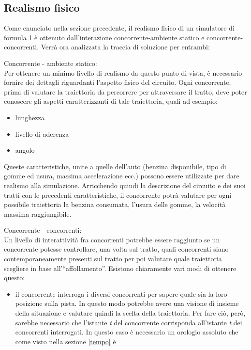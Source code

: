 \subsection{Realismo fisico}
\label{analisi_realismo_fisico}
Come enunciato nella sezione precedente, il realismo fisico di un simulatore di
formula 1 è ottenuto dall'interazione
concorrente-ambiente statico e concorrente-concorrenti. Verrà ora analizzata la
traccia di soluzione per entrambi:
\begin{description}
\item{Concorrente - ambiente statico:}\\
Per ottenere un minimo livello di realismo da questo punto di vista, è
necessario fornire dei dettagli riguardanti l'aspetto fisico
del circuito. Ogni concorrente, prima di valutare la traiettoria da percorrere
per attraversare il tratto, deve poter conoscere
gli aspetti caratterizzanti di tale traiettoria, quali ad esempio:
\begin{itemize}
\item lunghezza 
\item livello di aderenza
\item angolo
\end{itemize}
Queste caratteristiche, unite a quelle dell'auto (benzina disponibile, tipo di
gomme ed usura, massima accelerazione ecc.)
possono essere utilizzate per dare realismo alla simulazione.
Arricchendo quindi la descrizione del circuito e dei suoi tratti con le
precedenti caratteristiche, il concorrente potrà
valutare per ogni possibile traiettoria la benzina consumata, l'usura delle
gomme, la velocità massima raggiungibile.
\item{Concorrente - concorrenti:}\\
Un livello di interattività fra concorrenti potrebbe essere raggiunto se 
un concorrente potesse controllare, una volta sul tratto, quali concorrenti
siano contemporaneamente presenti sul tratto
per poi valutare quale traiettoria scegliere in base all'``affollamento''.
Esistono chiaramente vari modi di ottenere questo:
\begin{itemize}
\item il concorrente interroga i diversi concorrenti per sapere quale sia la
loro posizione sulla pista. In questo modo potrebbe
avere una visione di insieme della situazione e valutare quindi la scelta della
traiettoria. Per fare ciò, però, sarebbe 
necessario che l'istante \emph{t} del concorrente corrisponda all'istante
\emph{t} dei concorrenti interrogati. In questo caso
è necessario un orologio assoluto che come visto nella sezione \ref{tempo} è

\end{itemize}
\end{description}
